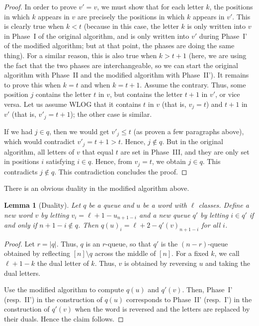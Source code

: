 \documentclass[reqno]{amsart}
\newcommand{\0}{\phantom{c}}
\newcommand{\abs}[1]{\left| #1 \right|}
\newcommand{\tup}[1]{\left( #1 \right)}
\theoremstyle{plain}
\newtheorem{lemma}[thm]{Lemma}
\theoremstyle{definition}
\numberwithin{equation}{section}
\begin{document}
\begin{proof}
In order to prove $v' = v$,
we must show that for each letter $k$,
the positions in which $k$ appears in $v$ are precisely the positions in which $k$ appears in $v'$.
This is clearly true when $k < t$ (because in this case, the letter $k$ is only written into $v$ in Phase~I of the original algorithm, and is only written into $v'$ during Phase~I' of the modified algorithm; but at that point, the phases are doing the same thing).
For a similar reason, this is also true when $k > t+1$ (here, we are using the fact that the two phases are interchangeable, so we can start the original algorithm with Phase~II and the modified algorithm with Phase~II').
It remains to prove this when $k = t$ and when $k = t+1$.
Assume the contrary.
Thus, some position $j$ contains the letter $t$ in $v$, but contains the letter $t+1$ in $v'$, or vice versa.
Let us assume WLOG that it contains $t$ in $v$ (that is, $v_j = t$) and $t+1$ in $v'$ (that is, $v'_j = t+1$); the other case is similar.

If we had $j \in q$, then we would get $v'_j \leq t$ (as proven a few paragraphs above), which would contradict $v'_j = t+1 > t$. Hence, $j \notin q$.
But in the original algorithm, all letters of $v$ that equal $t$ are set in Phase~III, and they are only set in positions $i$ satisfying $i \in q$. Hence, from $v_j = t$, we obtain $j \in q$. This contradicts $j \notin q$.
This contradiction concludes the proof.
\end{proof}

There is an obvious duality in the modified algorithm above.

\begin{lemma}[Duality]
  \label{le:dual}
  Let $q$ be a queue and $u$ be a word with $\ell$ classes.
  Define a new word $v$ by letting $v_i = \ell + 1 - u_{n+1-i}$ and a new queue $q'$ by letting $i \in q'$ if and only if $n+1-i \notin q$.
 Then $q(u)_i = \ell + 2 - q'(v)_{n+1-i}$ for all $i$.
\end{lemma}

\begin{proof}
Let $r = \abs{q}$. Thus, $q$ is an $r$-queue, so that $q'$ is the $(n-r)$-queue obtained by reflecting $[n] \setminus q$ across the middle of $[n]$.
For a fixed $k$, we call $\ell + 1 - k$ the dual letter of $k$.
Thus, $v$ is obtained by reversing $u$ and taking the dual letters.

Use the modified algorithm to compute $q \tup{u}$ and $q' \tup{v}$.
Then, Phase~I' (resp.~II') in the construction of $q(u)$ corresponds to Phase~II' (resp.~I') in the construction of $q'(v)$ when the word is reversed and the letters are replaced by their duals.
Hence the claim follows.
\end{proof}
\end{document}
